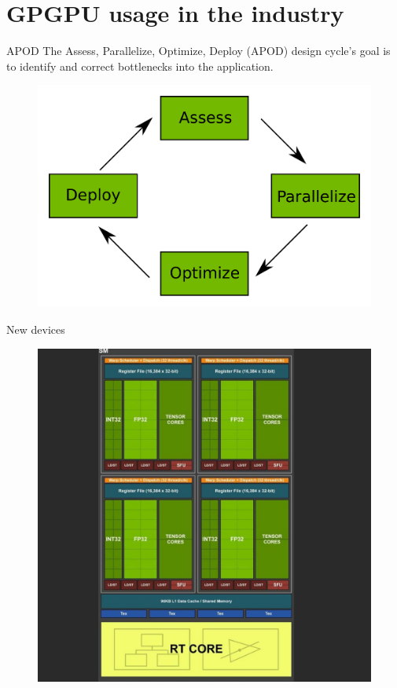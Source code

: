 \documentclass{beamer}
\begin{document}
\section{GPGPU usage in the industry}
\begin{frame}{APOD}
	The Assess, Parallelize, Optimize, Deploy (APOD) design cycle's goal is to identify and correct bottlenecks into the application. 
	\begin{figure}
		\includegraphics[scale=0.3]{figures/APOD.pdf}
	\end{figure}
\end{frame}

\begin{frame}{New devices}
	\begin{figure}
		\includegraphics[scale=0.3]{figures/TU102_SM.png}
	\end{figure}
\end{frame}
\end{document}

